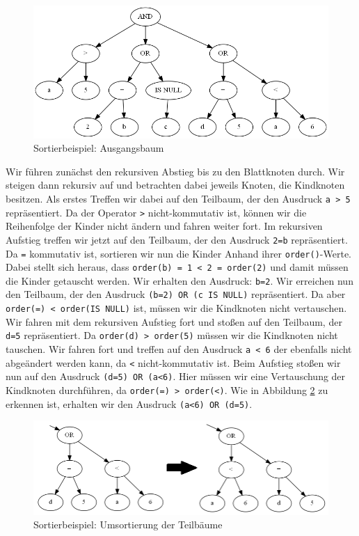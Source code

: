 \begin{figure}[H]
\includegraphics[scale=0.6]{Bilder/sort_1.png}
\caption{Sortierbeispiel: Ausgangsbaum}
\label{fig:sort_1}
\end{figure}

Wir führen zunächst den rekursiven Abstieg bis zu den Blattknoten durch. Wir steigen dann rekursiv auf und betrachten dabei jeweils Knoten, die Kindknoten besitzen. Als erstes Treffen wir dabei auf den Teilbaum, der den Ausdruck \verb|a > 5| repräsentiert. Da der Operator \verb|>| nicht-kommutativ ist, können wir die Reihenfolge der Kinder nicht ändern und fahren weiter fort. Im rekursiven Aufstieg treffen wir jetzt auf den Teilbaum, der den Ausdruck \verb|2=b| repräsentiert. Da \verb|=| kommutativ ist, sortieren wir nun die Kinder Anhand ihrer \verb|order()|-Werte. Dabei stellt sich heraus, dass \verb|order(b) = 1 < 2 = order(2)| und damit müssen die Kinder getauscht werden. Wir erhalten den Ausdruck: \verb|b=2|. 
Wir erreichen nun den Teilbaum, der den Ausdruck \verb|(b=2) OR (c IS NULL)| repräsentiert. Da aber \verb|order(=) < order(IS NULL)| ist, müssen wir die Kindknoten nicht vertauschen.
Wir fahren mit dem rekursiven Aufstieg fort und stoßen auf den Teilbaum, der \verb|d=5| repräsentiert. Da \verb|order(d) > order(5)| müssen wir die Kindknoten nicht tauschen. Wir fahren fort und treffen auf den Ausdruck \verb|a < 6| der ebenfalls nicht abgeändert werden kann, da \verb|<| nicht-kommutativ ist. 
Beim Aufstieg stoßen wir nun auf den Ausdruck \verb|(d=5) OR (a<6)|. Hier müssen wir eine Vertauschung der Kindknoten durchführen, da \verb|order(=) > order(<)|. Wie in Abbildung \ref{fig:sort_step1} zu erkennen ist, erhalten wir den Ausdruck \verb|(a<6) OR (d=5)|.

\begin{figure}[H]
\centering
\includegraphics[scale=0.5]{Bilder/sort_step1.png}
\caption{Sortierbeispiel: Umsortierung der Teilbäume}
\label{fig:sort_step1}
\end{figure}

